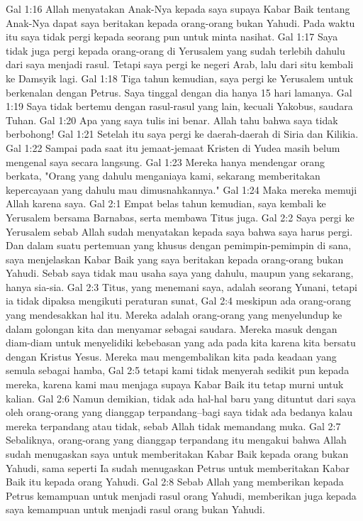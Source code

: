 Gal 1:16  Allah menyatakan Anak-Nya kepada saya supaya Kabar Baik tentang Anak-Nya dapat saya beritakan kepada orang-orang bukan Yahudi. Pada waktu itu saya tidak pergi kepada seorang pun untuk minta nasihat.
Gal 1:17  Saya tidak juga pergi kepada orang-orang di Yerusalem yang sudah terlebih dahulu dari saya menjadi rasul. Tetapi saya pergi ke negeri Arab, lalu dari situ kembali ke Damsyik lagi.
Gal 1:18  Tiga tahun kemudian, saya pergi ke Yerusalem untuk berkenalan dengan Petrus. Saya tinggal dengan dia hanya 15 hari lamanya.
Gal 1:19  Saya tidak bertemu dengan rasul-rasul yang lain, kecuali Yakobus, saudara Tuhan.
Gal 1:20  Apa yang saya tulis ini benar. Allah tahu bahwa saya tidak berbohong!
Gal 1:21  Setelah itu saya pergi ke daerah-daerah di Siria dan Kilikia.
Gal 1:22  Sampai pada saat itu jemaat-jemaat Kristen di Yudea masih belum mengenal saya secara langsung.
Gal 1:23  Mereka hanya mendengar orang berkata, "Orang yang dahulu menganiaya kami, sekarang memberitakan kepercayaan yang dahulu mau dimusnahkannya."
Gal 1:24  Maka mereka memuji Allah karena saya.
Gal 2:1  Empat belas tahun kemudian, saya kembali ke Yerusalem bersama Barnabas, serta membawa Titus juga.
Gal 2:2  Saya pergi ke Yerusalem sebab Allah sudah menyatakan kepada saya bahwa saya harus pergi. Dan dalam suatu pertemuan yang khusus dengan pemimpin-pemimpin di sana, saya menjelaskan Kabar Baik yang saya beritakan kepada orang-orang bukan Yahudi. Sebab saya tidak mau usaha saya yang dahulu, maupun yang sekarang, hanya sia-sia.
Gal 2:3  Titus, yang menemani saya, adalah seorang Yunani, tetapi ia tidak dipaksa mengikuti peraturan sunat,
Gal 2:4  meskipun ada orang-orang yang mendesakkan hal itu. Mereka adalah orang-orang yang menyelundup ke dalam golongan kita dan menyamar sebagai saudara. Mereka masuk dengan diam-diam untuk menyelidiki kebebasan yang ada pada kita karena kita bersatu dengan Kristus Yesus. Mereka mau mengembalikan kita pada keadaan yang semula sebagai hamba,
Gal 2:5  tetapi kami tidak menyerah sedikit pun kepada mereka, karena kami mau menjaga supaya Kabar Baik itu tetap murni untuk kalian.
Gal 2:6  Namun demikian, tidak ada hal-hal baru yang dituntut dari saya oleh orang-orang yang dianggap terpandang--bagi saya tidak ada bedanya kalau mereka terpandang atau tidak, sebab Allah tidak memandang muka.
Gal 2:7  Sebaliknya, orang-orang yang dianggap terpandang itu mengakui bahwa Allah sudah menugaskan saya untuk memberitakan Kabar Baik kepada orang bukan Yahudi, sama seperti Ia sudah menugaskan Petrus untuk memberitakan Kabar Baik itu kepada orang Yahudi.
Gal 2:8  Sebab Allah yang memberikan kepada Petrus kemampuan untuk menjadi rasul orang Yahudi, memberikan juga kepada saya kemampuan untuk menjadi rasul orang bukan Yahudi.
